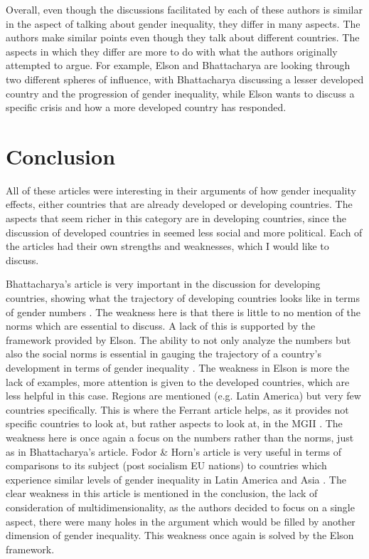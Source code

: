 \documentclass[12pt, letterpaper]{article}
\begin{document}
Overall, even though the discussions facilitated by each of these authors is similar in the aspect of talking about gender inequality, they differ in many aspects. The authors make similar points even though they talk about different countries. The aspects in which they differ are more to do with what the authors originally attempted to argue. For example, Elson and Bhattacharya are looking through two different spheres of influence, with Bhattacharya discussing a lesser developed country and the progression of gender inequality, while Elson wants to discuss a specific crisis and how a more developed country has responded.
\newpage
\section*{Conclusion}
All of these articles were interesting in their arguments of how gender inequality effects, either countries that are already developed or developing countries. The aspects that seem richer in this category are in developing countries, since the discussion of developed countries in \cite{elson} seemed less social and more political. Each of the articles had their own strengths and weaknesses, which I would like to discuss.

Bhattacharya's article is very important in the discussion for developing countries, showing what the trajectory of developing countries looks like in terms of gender numbers \cite{bhatt}. The weakness here is that there is little to no mention of the norms which are essential to discuss. A lack of this is supported by the framework provided by Elson. The ability to not only analyze the numbers but also the social norms is essential in gauging the trajectory of a country's development in terms of gender inequality \cite{elson}. The weakness in Elson is more the lack of examples, more attention is given to the developed countries, which are less helpful in this case. Regions are mentioned (e.g. Latin America) but very few countries specifically. This is where the Ferrant article helps, as it provides not specific countries to look at, but rather aspects to look at, in the MGII \cite{ferrant}. The weakness here is once again a focus on the numbers rather than the norms, just as in Bhattacharya's article. Fodor \& Horn's article is very useful in terms of comparisons to its subject (post socialism EU nations) to countries which experience similar levels of gender inequality in Latin America and Asia \cite{foho}. The clear weakness in this article is mentioned in the conclusion, the lack of consideration of multidimensionality, as the authors decided to focus on a single aspect, there were many holes in the argument which would be filled by another dimension of gender inequality. This weakness once again is solved by the Elson framework. 
\end{document}
